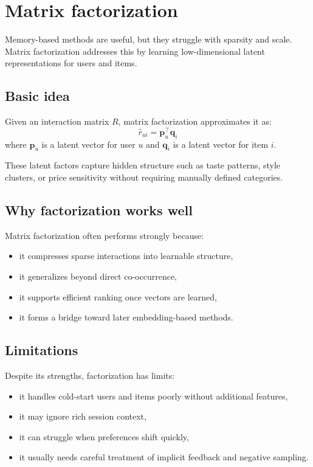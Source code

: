 \section{Matrix factorization}
Memory-based methods are useful, but they struggle with sparsity and scale.
Matrix factorization addresses this by learning low-dimensional latent representations for users and items.

\subsection{Basic idea}
Given an interaction matrix $R$, matrix factorization approximates it as:
\[
\hat{r}_{ui}=\mathbf{p}_u^\top \mathbf{q}_i
\]
where $\mathbf{p}_u$ is a latent vector for user $u$ and $\mathbf{q}_i$ is a latent vector for item $i$.

These latent factors capture hidden structure such as taste patterns, style clusters, or price sensitivity without requiring manually defined categories.

\subsection{Why factorization works well}
Matrix factorization often performs strongly because:
\begin{itemize}
  \item it compresses sparse interactions into learnable structure,
  \item it generalizes beyond direct co-occurrence,
  \item it supports efficient ranking once vectors are learned,
  \item it forms a bridge toward later embedding-based methods.
\end{itemize}

\subsection{Limitations}
Despite its strengths, factorization has limits:
\begin{itemize}
  \item it handles cold-start users and items poorly without additional features,
  \item it may ignore rich session context,
  \item it can struggle when preferences shift quickly,
  \item it usually needs careful treatment of implicit feedback and negative sampling.
\end{itemize}

